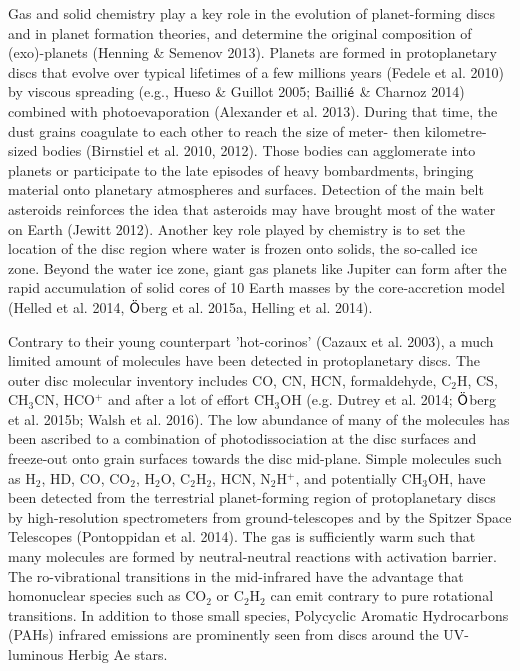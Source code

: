 \documentclass[10pt,fleqn,twoside]{article}
\begin{document}
Gas and solid chemistry play a key role in the evolution of planet-forming discs and in planet formation theories, and determine the original composition of (exo)-planets (Henning \& Semenov 2013).  Planets are formed in protoplanetary discs that evolve over typical lifetimes of a few millions years (Fedele et al. 2010) by viscous spreading (e.g., Hueso \& Guillot 2005; Bailli$\acute{\textsf e}$ \& Charnoz 2014) combined with photoevaporation (Alexander et al. 2013). During that time, the dust grains coagulate to each other to reach the size of meter- then kilometre- sized bodies (Birnstiel et al. 2010, 2012). Those bodies can agglomerate into planets or participate to the late episodes of heavy bombardments, bringing material onto planetary atmospheres and surfaces. Detection of the main belt asteroids reinforces the idea that asteroids may have brought most of the water on Earth (Jewitt 2012). Another key role played by chemistry is to set the location of the disc region where water is frozen onto solids, the so-called ice zone. Beyond the water ice zone, giant gas planets like Jupiter can form after the rapid accumulation of solid cores of 10 Earth masses by the core-accretion model (Helled et al. 2014, $\ddot{\textsf O}$berg et al. 2015a, Helling et al. 2014).

Contrary to their young counterpart 'hot-corinos' (Cazaux et al. 2003), a much limited amount of molecules have been detected in protoplanetary discs. The outer disc molecular inventory includes CO, CN, HCN, formaldehyde, C$_2$H, CS, CH$_3$CN, HCO$^+$ and after a lot of effort CH$_3$OH (e.g. Dutrey et al. 2014;  $\ddot{\textsf O}$berg et al. 2015b; Walsh et al. 2016). The low abundance of many of the molecules has been ascribed to a combination of photodissociation at the disc surfaces and freeze-out onto grain surfaces towards the disc mid-plane. Simple molecules such as H$_2$, HD, CO, CO$_2$, H$_2$O, C$_2$H$_2$, HCN, N$_2$H$^+$, and potentially CH$_3$OH, have been detected from the terrestrial planet-forming region of protoplanetary discs by high-resolution spectrometers from ground-telescopes and by the Spitzer Space Telescopes (Pontoppidan et al. 2014). The gas is sufficiently warm such that many molecules are formed by neutral-neutral reactions with activation barrier. The ro-vibrational transitions in the mid-infrared have the advantage that homonuclear species such as CO$_2$ or C$_2$H$_2$ can emit contrary to pure rotational transitions. In addition to those small species, Polycyclic Aromatic Hydrocarbons (PAHs) infrared emissions are prominently seen from discs around the UV-luminous Herbig Ae stars. 
\end{document}

